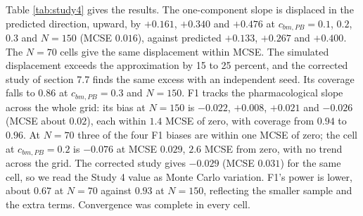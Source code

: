 \documentclass[
  11pt,
]{article}
\begin{document}
\begin{table}[H]
\centering
\caption{\label{tab:study4}Study 4: balanced-placebo design, 1,000 replicates per cell. Bias of the bm:Dbc coefficient against $-2.25$ for the one-component analysis and F1, with the identity's predicted displacement of the one-component slope and nominal-95\% interval coverage.}
\centering
{}
\end{table}

Table \ref{tab:study4} gives the results. The one-component slope is
displaced in the predicted direction, upward, by
\(+0.161\),
\(+0.340\) and
\(+0.476\) at
\(c_{bm,PB} = 0.1\), \(0.2\), \(0.3\) and \(N = 150\) (MCSE
\(0.016\)), against
predicted \(+0.133\),
\(+0.267\) and
\(+0.400\). The \(N = 70\)
cells give the same displacement within MCSE. The simulated
displacement exceeds the approximation by 15 to 25 percent, and the
corrected study of section 7.7 finds the same excess with an independent
seed. Its coverage falls to
\(0.86\) at
\(c_{bm,PB} = 0.3\) and \(N = 150\). F1 tracks the pharmacological
slope across the whole grid: its bias at \(N = 150\) is
\(-0.022\),
\(+0.008\),
\(+0.021\) and
\(-0.026\) (MCSE
about \(0.02\)), each within \(1.4\) MCSE of zero, with coverage from
\(0.94\)
to \(0.96\).
At \(N = 70\) three of the four F1 biases are within one MCSE of
zero; the cell at \(c_{bm,PB} = 0.2\) is
\(-0.076\) at MCSE
\(0.029\), \(2.6\)
MCSE from zero, with no trend across the grid. The corrected study gives
\(-0.029\) (MCSE
\(0.031\)) for the same
cell, so we read the Study 4 value as Monte Carlo variation. F1's power is lower,
about \(0.67\)
at \(N = 70\) against
\(0.93\)
at \(N = 150\), reflecting the smaller sample and the extra terms.
Convergence was complete in every cell.
\end{document}
